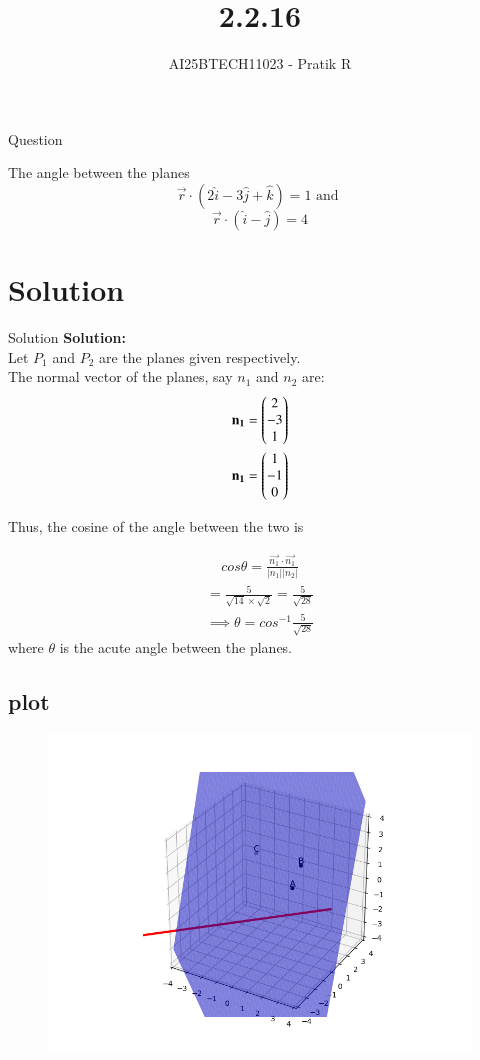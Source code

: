 \documentclass{beamer}
\title
{2.2.16}
\author 
{AI25BTECH11023 - Pratik R}
\begin{document}
\frame{\titlepage}
\begin{frame}{Question}

 The angle between the planes
$$
\vec r \cdot (2\hat{i}-3\hat{j}+\hat{k})=1 \text{ and } 
$$
$$
\vec r \cdot(\hat{i}-\hat{j})=4
$$   

\end{frame}

    

\section{Solution}
\begin{frame}{Solution}
\textbf{Solution:} 
\\
Let $P_1$ and $P_2$ are the planes given respectively. \\
The normal vector of the planes, say $n_1$ and $n_2$ are:
\begin{align}
    \mathbf {n_1}= \begin{pmatrix}2 \\ -3 \\ 1\end{pmatrix} \\
    \mathbf {n_1}= \begin{pmatrix}1 \\ -1 \\ 0\end{pmatrix}
\end{align}

Thus, the cosine of the angle between the two is


\begin{align}
   cos\theta = \frac{\vec {n_1} \cdot \vec {n_1}}{|n_1||n_2|}  
\end{align}
\begin{align}
    = \frac{5}{\sqrt{14}\times\sqrt{2}} = \frac{5}{\sqrt{28}}
\end{align}
\begin{align}
    \implies \theta = cos^{-1}\frac{5}{\sqrt{28}}
\end{align}
where $\theta$ is the acute angle between the planes.

    \end{frame}
    \subsection{plot}
       \begin{frame}[fragile]
    \begin{figure}[H]
    \centering
    \includegraphics[width = 0.6\columnwidth]{../figs/fig.png}
    \caption*{}
    \label{figs}
\end{figure}
\end{frame}
\end{document}

